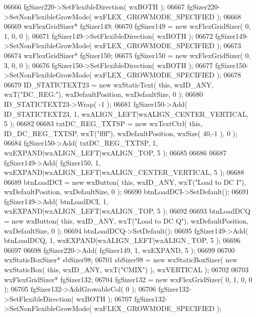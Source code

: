 \begin{DoxyCode}
06666     fgSizer220->SetFlexibleDirection( wxBOTH );
06667     fgSizer220->SetNonFlexibleGrowMode( wxFLEX\_GROWMODE\_SPECIFIED );
06668     
06669     wxFlexGridSizer* fgSizer149;
06670     fgSizer149 = \textcolor{keyword}{new} wxFlexGridSizer( 0, 1, 0, 0 );
06671     fgSizer149->SetFlexibleDirection( wxBOTH );
06672     fgSizer149->SetNonFlexibleGrowMode( wxFLEX\_GROWMODE\_SPECIFIED );
06673     
06674     wxFlexGridSizer* fgSizer150;
06675     fgSizer150 = \textcolor{keyword}{new} wxFlexGridSizer( 0, 3, 0, 0 );
06676     fgSizer150->SetFlexibleDirection( wxBOTH );
06677     fgSizer150->SetNonFlexibleGrowMode( wxFLEX\_GROWMODE\_SPECIFIED );
06678     
06679     ID_STATICTEXT23 = \textcolor{keyword}{new} wxStaticText( \textcolor{keyword}{this}, wxID\_ANY, wxT(\textcolor{stringliteral}{"DC\_REG:"}), wxDefaultPosition, wxDefaultSize, 0
       );
06680     ID_STATICTEXT23->Wrap( -1 );
06681     fgSizer150->Add( ID_STATICTEXT23, 1, wxALIGN\_LEFT|wxALIGN\_CENTER\_VERTICAL, 5 );
06682     
06683     txtDC_REG_TXTSP = \textcolor{keyword}{new} wxTextCtrl( \textcolor{keyword}{this}, ID_DC_REG_TXTSP, wxT(\textcolor{stringliteral}{"ffff"}), wxDefaultPosition, wxSize( 40,-1 
      ), 0 );
06684     fgSizer150->Add( txtDC_REG_TXTSP, 1, wxEXPAND|wxALIGN\_LEFT|wxALIGN\_TOP, 5 );
06685     
06686     
06687     fgSizer149->Add( fgSizer150, 1, wxEXPAND|wxALIGN\_LEFT|wxALIGN\_CENTER\_VERTICAL, 5 );
06688     
06689     btnLoadDCI = \textcolor{keyword}{new} wxButton( \textcolor{keyword}{this}, wxID\_ANY, wxT(\textcolor{stringliteral}{"Load to DC I"}), wxDefaultPosition, wxDefaultSize, 0 );
06690     btnLoadDCI->SetDefault(); 
06691     fgSizer149->Add( btnLoadDCI, 1, wxEXPAND|wxALIGN\_LEFT|wxALIGN\_TOP, 5 );
06692     
06693     btnLoadDCQ = \textcolor{keyword}{new} wxButton( \textcolor{keyword}{this}, wxID\_ANY, wxT(\textcolor{stringliteral}{"Load to DC Q"}), wxDefaultPosition, wxDefaultSize, 0 );
06694     btnLoadDCQ->SetDefault(); 
06695     fgSizer149->Add( btnLoadDCQ, 1, wxEXPAND|wxALIGN\_LEFT|wxALIGN\_TOP, 5 );
06696     
06697     
06698     fgSizer220->Add( fgSizer149, 1, wxEXPAND, 5 );
06699     
06700     wxStaticBoxSizer* sbSizer98;
06701     sbSizer98 = \textcolor{keyword}{new} wxStaticBoxSizer( \textcolor{keyword}{new} wxStaticBox( \textcolor{keyword}{this}, wxID\_ANY, wxT(\textcolor{stringliteral}{"CMIX"}) ), wxVERTICAL );
06702     
06703     wxFlexGridSizer* fgSizer132;
06704     fgSizer132 = \textcolor{keyword}{new} wxFlexGridSizer( 0, 1, 0, 0 );
06705     fgSizer132->AddGrowableCol( 0 );
06706     fgSizer132->SetFlexibleDirection( wxBOTH );
06707     fgSizer132->SetNonFlexibleGrowMode( wxFLEX\_GROWMODE\_SPECIFIED );

\end{DoxyCode}
